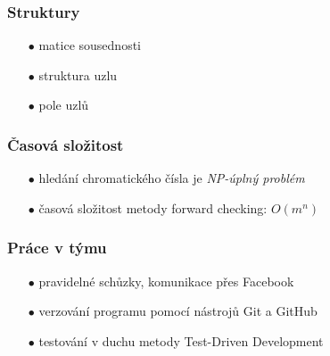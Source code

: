 \documentclass[10pt,xcolor=pdflatex]{beamer}
\begin{document}
\begin{frame}\frametitle{Struktury}
    \begin{itemize}
	\item[$\bullet$] matice sousednosti
	\item[$\bullet$] struktura uzlu
	\item[$\bullet$] pole uzlů
	\end{itemize}
\end{frame}

\begin{frame}\frametitle{Časová složitost}
	\begin{itemize}
	\item[$\bullet$] hledání chromatického čísla je \emph{NP-úplný problém}
    \item[$\bullet$] časová složitost metody forward checking: \emph{$O(m^n)$}
    \end{itemize}
\end{frame}

\begin{frame}\frametitle{Práce v týmu}
    \begin{itemize}
	\item[$\bullet$] pravidelné schůzky, komunikace přes Facebook
	\item[$\bullet$] verzování programu pomocí nástrojů Git a GitHub
	\item[$\bullet$] testování v duchu metody Test-Driven Development
	\end{itemize}
\end{frame}

\end{document}
